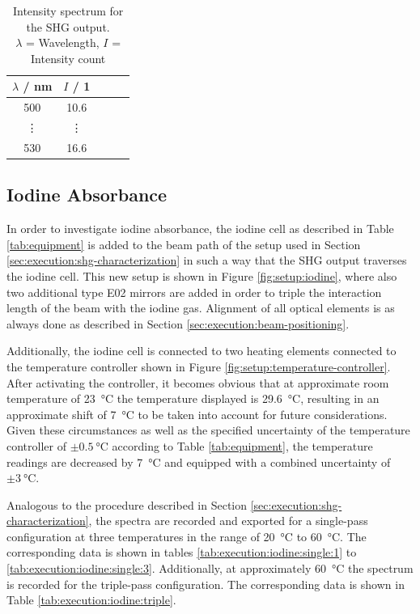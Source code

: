 \begin{table}[H]
    \centering
    \caption{Intensity spectrum for the SHG output. \\
    $\lambda$ = Wavelength, $I$ = Intensity count}
    \label{tab:execution:shg-characterization}
    \begin{tabular}{ccccc}
    \hline
    $\lambda$ / nm & $I$ / 1 \\ \hline
    500  & 10.6  \\
    \vdots & \vdots  \\
    530 & 16.6 \\ \hline
    \end{tabular}
\end{table}

\subsection{Iodine Absorbance}
\label{sec:execution:iodine}

In order to investigate iodine absorbance, the iodine cell as described in Table \ref{tab:equipment} is added to the beam path of the setup used in Section \ref{sec:execution:shg-characterization} in such a way that the SHG output traverses the iodine cell. This new setup is shown in Figure \ref{fig:setup:iodine}, where also two additional type E02 mirrors are added in order to triple the interaction length of the beam with the iodine gas. Alignment of all optical elements is as always done as described in Section \ref{sec:execution:beam-positioning}. 

Additionally, the iodine cell is connected to two heating elements connected to the temperature controller shown in Figure \ref{fig:setup:temperature-controller}. After activating the controller, it becomes obvious that at approximate room temperature of \SI{23}{\celsius} the temperature displayed is \SI{29.6}{\celsius}, resulting in an approximate shift of \SI{7}{\celsius} to be taken into account for future considerations. Given these circumstances as well as the specified uncertainty of the temperature controller of $\pm \SI{0.5}{\celsius}$ according to Table \ref{tab:equipment}, the temperature readings are decreased by \SI{7}{\celsius} and equipped with a combined uncertainty of $\pm \SI{3}{\celsius}$.

Analogous to the procedure described in Section \ref{sec:execution:shg-characterization}, the spectra are recorded and exported for a single-pass configuration at three temperatures in the range of \SI{20}{\celsius} to \SI{60}{\celsius}. The corresponding data is shown in tables \ref{tab:execution:iodine:single:1} to \ref{tab:execution:iodine:single:3}. Additionally, at approximately \SI{60}{\celsius} the spectrum is recorded for the triple-pass configuration. The corresponding data is shown in Table \ref{tab:execution:iodine:triple}.

